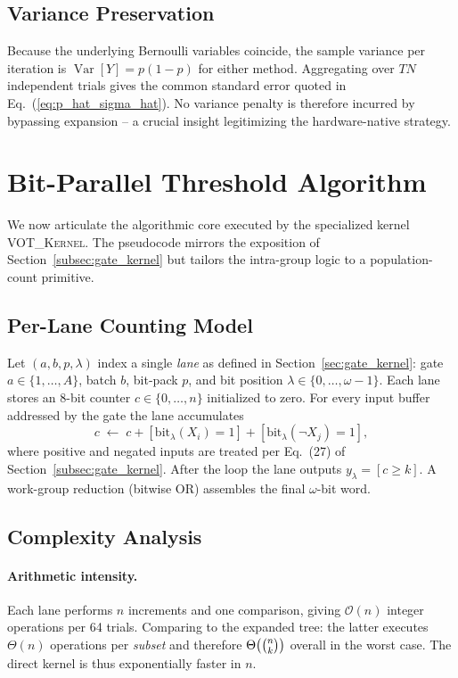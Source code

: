 \subsection{Variance Preservation}
\label{sec:voter_variance}

Because the underlying Bernoulli variables coincide, the sample variance per
iteration is
\(
  \operatorname{Var}[Y] = p(1-p)
\)
for either method.  Aggregating over $T N$ independent trials gives the common
standard error quoted in Eq.~(\ref{eq:p_hat_sigma_hat}).  No variance penalty
is therefore incurred by bypassing expansion – a crucial insight legitimizing
the hardware-native strategy.

\section{Bit-Parallel Threshold Algorithm}
\label{sec:voter_algorithm}

We now articulate the algorithmic core executed by the specialized kernel
\textsc{VOT\_Kernel}.  The pseudocode mirrors the exposition of
Section~\ref{subsec:gate_kernel} but tailors the intra-group logic to a
population-count primitive.

\subsection{Per-Lane Counting Model}

Let $(a,b,p,\lambda)$ index a single \emph{lane} as defined in
Section~\ref{sec:gate_kernel}: gate $a\in\{1,\dots,A\}$, batch $b$, bit-pack
$p$, and bit position $\lambda\in\{0,\dots,\omega-1\}$.  Each lane stores an
8-bit counter $c\in\{0,\dots,n\}$ initialized to zero.  For every input buffer
addressed by the gate the lane accumulates
\[
  c\;\leftarrow\;c + [\text{bit}_{\lambda}(X_i)=1] + [\text{bit}_{\lambda}(\lnot X_j)=1],
\]
where positive and negated inputs are treated per
Eq.~(27) of Section~\ref{subsec:gate_kernel}.  After the loop the lane outputs
\(
  y_{\lambda} = [c\ge k].
\)
A work-group reduction (bitwise OR) assembles the final $\omega$-bit word.

\subsection{Complexity Analysis}
\label{sec:voter_complexity}

\paragraph{Arithmetic intensity.}  Each lane performs $n$ increments and one
comparison, giving $\mathcal{O}(n)$ integer operations per 64 trials.
Comparing to the expanded tree: the latter executes $\Theta(n)$ operations per
\emph{subset} and therefore $\Theta\bigl(\tbinom{n}{k}\bigr)$ overall in the
worst case.  The direct kernel is thus exponentially faster in $n$.

